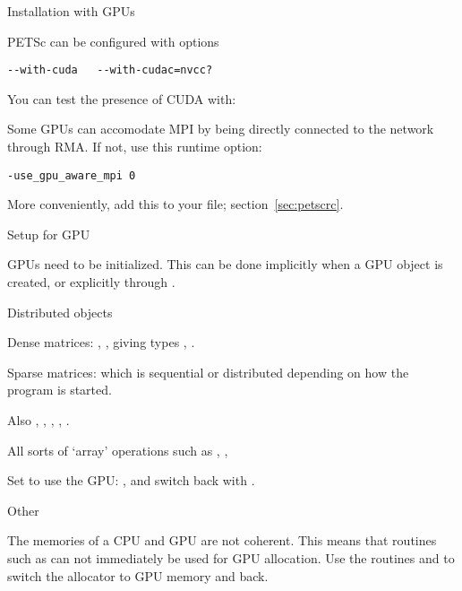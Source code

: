 
 {Installation with GPUs}

PETSc can be configured with options
\begin{verbatim}
--with-cuda   --with-cudac=nvcc?
\end{verbatim}
You can test the presence of CUDA with:


Some GPUs can accomodate MPI by being directly connected to the network
through  \ac{RMA}.
If not, use this runtime option:
\begin{verbatim}
-use_gpu_aware_mpi 0
\end{verbatim}
More conveniently, add this to your  file;
section~\ref{sec:petscrc}.

 {Setup for GPU}

GPUs need to be initialized.
This can be done implicitly when a GPU object is created,
or explicitly through .


 {Distributed objects}

Dense matrices:
,
,
giving types
,
.

Sparse matrices:
which is sequential or distributed
depending on how the program is started.

Also
,
,
,
,
.

All sorts of `array' operations such as
,
,

Set  to use the GPU:
,
and switch back with
.

 {Other}
\label{sec:petsc-malloc-gpu}

The memories of a CPU and GPU are not coherent.
This means that routines such as 
can not immediately be used for GPU allocation.
Use the routines 
and 
to switch the allocator to GPU memory and back.


